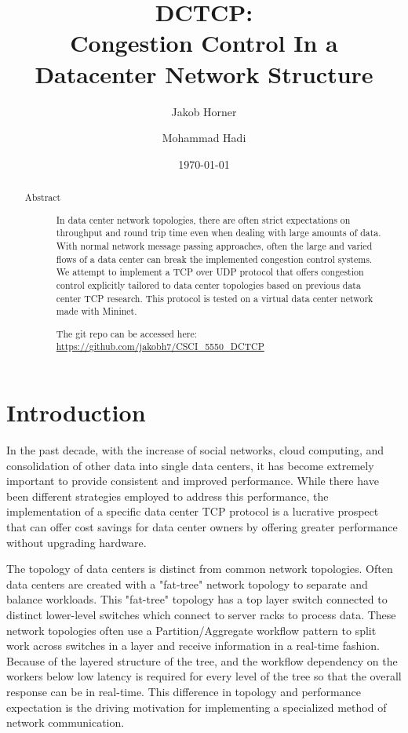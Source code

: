 \documentclass[%
 reprint,
amsmath,amssymb,
aps,
]{revtex4-2}
\begin{document}
\title{DCTCP:\\Congestion Control In a Datacenter Network Structure}

\author{Jakob Horner}

\author{Mohammad Hadi}


\date{\today}

\begin{abstract}
\begin{description}
\item[Abstract]
In data center network topologies, there are often strict expectations on throughput and round trip time even when dealing with large amounts of data. With normal network message passing approaches, often the large and varied flows of a data center can break the implemented congestion control systems. We attempt to implement a TCP over UDP protocol that offers congestion control explicitly tailored to data center topologies based on previous data center TCP research. This protocol is tested on a virtual data center network made with Mininet. 

The git repo can be accessed here: \url{https://github.com/jakobh7/CSCI_5550_DCTCP}
\end{description}
\end{abstract}

\maketitle

\section{Introduction}
In the past decade, with the increase of social networks, cloud computing, and consolidation of  other data into single data centers, it has become extremely important to provide consistent and improved performance. While there have been different strategies employed to address this performance, the implementation of a specific data center TCP protocol is a lucrative prospect that can offer cost savings for data center owners by offering greater performance without upgrading hardware.

The topology of data centers is distinct from common network topologies. Often data centers are created with a "fat-tree" network topology to separate and balance workloads. This "fat-tree" topology has a top layer switch connected to distinct lower-level switches which connect to server racks to process data. These network topologies often use a Partition/Aggregate workflow pattern to split work across switches in a layer and receive information in a real-time fashion. Because of the layered structure of the tree, and the workflow dependency on the workers below low latency is required for every level of the tree so that the overall response can be in real-time. This difference in topology and performance expectation is the driving motivation for implementing a specialized method of network communication.
\end{document}
